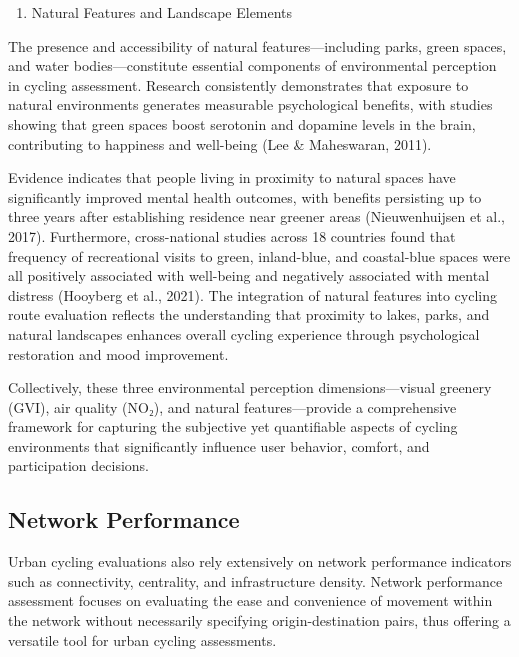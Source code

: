 \documentclass[
  12pt,
  oneside]{book}
\providecommand{\tightlist}{%
  \setlength{\itemsep}{0pt}\setlength{\parskip}{0pt}}
\begin{document}
\begin{enumerate}
\def\labelenumi{\arabic{enumi}.}
\setcounter{enumi}{2}
\tightlist
\item
  Natural Features and Landscape Elements
\end{enumerate}

The presence and accessibility of natural features---including parks, green spaces, and water bodies---constitute essential components of environmental perception in cycling assessment. Research consistently demonstrates that exposure to natural environments generates measurable psychological benefits, with studies showing that green spaces boost serotonin and dopamine levels in the brain, contributing to happiness and well-being (Lee \& Maheswaran, 2011).

Evidence indicates that people living in proximity to natural spaces have significantly improved mental health outcomes, with benefits persisting up to three years after establishing residence near greener areas (Nieuwenhuijsen et al., 2017). Furthermore, cross-national studies across 18 countries found that frequency of recreational visits to green, inland-blue, and coastal-blue spaces were all positively associated with well-being and negatively associated with mental distress (Hooyberg et al., 2021). The integration of natural features into cycling route evaluation reflects the understanding that proximity to lakes, parks, and natural landscapes enhances overall cycling experience through psychological restoration and mood improvement.

Collectively, these three environmental perception dimensions---visual greenery (GVI), air quality (NO₂), and natural features---provide a comprehensive framework for capturing the subjective yet quantifiable aspects of cycling environments that significantly influence user behavior, comfort, and participation decisions.

\subsection{Network Performance}\label{network-performance}

Urban cycling evaluations also rely extensively on network performance indicators such as connectivity, centrality, and infrastructure density. Network performance assessment focuses on evaluating the ease and convenience of movement within the network without necessarily specifying origin-destination pairs, thus offering a versatile tool for urban cycling assessments.
\end{document}
